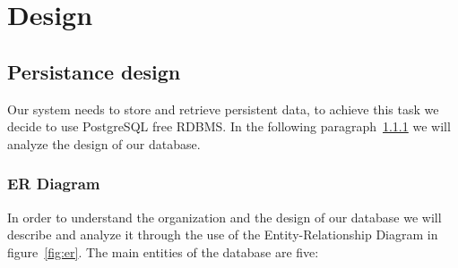 \chapter{Design} \label{cap:cap3}

\section{Persistance design}
Our system needs to store and retrieve persistent data, to achieve this task we decide to use PostgreSQL free RDBMS. In the following paragraph~\ref{sec:er} we will analyze the design of our database.
\subsection{ER Diagram}\label{sec:er}
In order to understand the organization and the design of our database we will describe and analyze it through the use of the Entity-Relationship Diagram in figure~\ref{fig:er}.
The main entities of the database are five:
